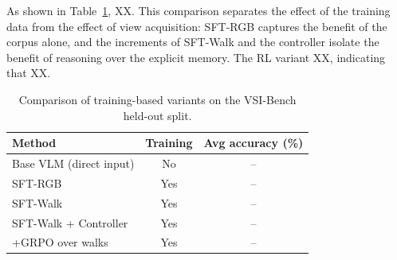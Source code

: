 As shown in Table~\ref{tab:vt_training_baseline}, XX. This comparison separates the effect of the training data from the effect of view acquisition: SFT-RGB captures the benefit of the corpus alone, and the increments of SFT-Walk and the controller isolate the benefit of reasoning over the explicit memory. The RL variant XX, indicating that XX.

\begin{table}[t]
	\centering
	\begin{tabular}{lcc}
		\toprule
		Method & Training & Avg accuracy (\%) \\
		\midrule
		Base VLM (direct input)      & No  & -- \\
		SFT-RGB                      & Yes & -- \\
		SFT-Walk                     & Yes & -- \\
		SFT-Walk + Controller        & Yes & -- \\
		\;\;+GRPO over walks         & Yes & -- \\
		\bottomrule
	\end{tabular}
	\caption{Comparison of training-based variants on the VSI-Bench held-out split.}
	\label{tab:vt_training_baseline}
	\vspace{-0.2in}
\end{table}
